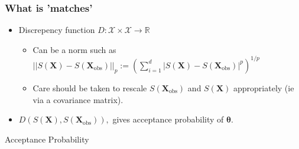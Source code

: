 \documentclass{beamer}
\begin{document}
\begin{frame}
    \frametitle{What is 'matches'}
    \begin{itemize}
        \item Discrepency function $D:\mathcal{X}\times \mathcal{X} \to \mathbb{R}$ \begin{itemize}
                  \item Can be a norm such as $||S(\mathbf{X}) - S(\mathbf{X}_\text{obs})||_p:=(\sum_{i = 1}^d|S(\mathbf{X}) - S(\mathbf{X}_\text{obs})|^p)^{1/p}$
                  \item <2-> Care should be taken to rescale $S(\mathbf{X}_\text{obs})$ and $S(\mathbf{X})$ appropriately (ie via a covariance matrix).
              \end{itemize}
        \item <3-> $D(S(\mathbf{X}), S(\mathbf{X}_\text{obs})),$ gives acceptance probability of $\bm\theta.$
    \end{itemize}
\end{frame}

\begin{frame}{Acceptance Probability}
    \begin{figure}
        \centering
    \end{figure}
\end{frame}
\end{document}
